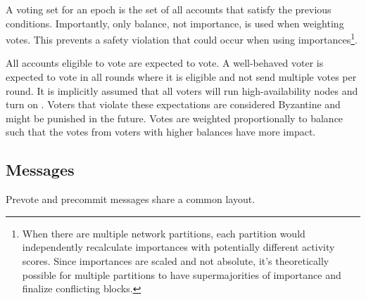 A voting set for an epoch is the set of all accounts that satisfy the previous conditions.
Importantly, only balance, not importance, is used when weighting votes.
This prevents a safety violation that could occur when using importances\footnote{
	When there are multiple network partitions, each partition would independently recalculate importances with potentially different activity scores.
	Since importances are scaled and not absolute, it's theoretically possible for multiple partitions to have supermajorities of importance and finalize conflicting blocks.
}.

All accounts eligible to vote are expected to vote.
A well-behaved voter is expected to vote in all rounds where it is eligible and not send multiple votes per round.
It is implicitly assumed that all voters will run high-availability nodes and turn on .
Voters that violate these expectations are considered Byzantine and might be punished in the future.
Votes are weighted proportionally to balance such that the votes from voters with higher balances have more impact.

\subsection{Messages}

Prevote and precommit messages share a common layout.

\begin{figure}[H]
\end{figure}


